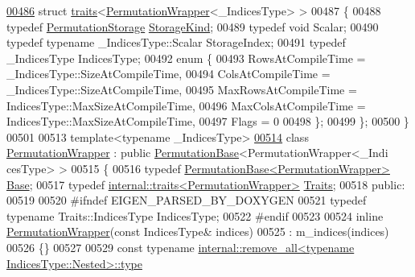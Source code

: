 \begin{DoxyCode}
\hyperlink{struct_eigen_1_1internal_1_1traits_3_01_permutation_wrapper_3_01___indices_type_01_4_01_4}{00486} \textcolor{keyword}{struct }\hyperlink{struct_eigen_1_1internal_1_1traits}{traits}<\hyperlink{group___core___module_class_eigen_1_1_permutation_wrapper}{PermutationWrapper}<\_IndicesType> >
00487 \{
00488   \textcolor{keyword}{typedef} \hyperlink{struct_eigen_1_1_permutation_storage}{PermutationStorage} \hyperlink{struct_eigen_1_1_permutation_storage}{StorageKind};
00489   \textcolor{keyword}{typedef} \textcolor{keywordtype}{void} Scalar;
00490   \textcolor{keyword}{typedef} \textcolor{keyword}{typename} \_IndicesType::Scalar StorageIndex;
00491   \textcolor{keyword}{typedef} \_IndicesType IndicesType;
00492   \textcolor{keyword}{enum} \{
00493     RowsAtCompileTime = \_IndicesType::SizeAtCompileTime,
00494     ColsAtCompileTime = \_IndicesType::SizeAtCompileTime,
00495     MaxRowsAtCompileTime = IndicesType::MaxSizeAtCompileTime,
00496     MaxColsAtCompileTime = IndicesType::MaxSizeAtCompileTime,
00497     Flags = 0
00498   \};
00499 \};
00500 \}
00501 
00513 \textcolor{keyword}{template}<\textcolor{keyword}{typename} \_IndicesType>
\hyperlink{group___core___module}{00514} \textcolor{keyword}{class }\hyperlink{group___core___module_class_eigen_1_1_permutation_wrapper}{PermutationWrapper} : \textcolor{keyword}{public} \hyperlink{group___core___module_class_eigen_1_1_permutation_base}{PermutationBase}<PermutationWrapper<\_Indi
      cesType> >
00515 \{
00516     \textcolor{keyword}{typedef} \hyperlink{group___core___module_class_eigen_1_1_permutation_base}{PermutationBase<PermutationWrapper>} 
      \hyperlink{group___core___module_class_eigen_1_1_permutation_base}{Base};
00517     \textcolor{keyword}{typedef} \hyperlink{struct_eigen_1_1internal_1_1traits}{internal::traits<PermutationWrapper>} 
      \hyperlink{struct_eigen_1_1internal_1_1traits}{Traits};
00518   \textcolor{keyword}{public}:
00519 
00520 \textcolor{preprocessor}{    #ifndef EIGEN\_PARSED\_BY\_DOXYGEN}
00521     \textcolor{keyword}{typedef} \textcolor{keyword}{typename} Traits::IndicesType IndicesType;
00522 \textcolor{preprocessor}{    #endif}
00523 
00524     \textcolor{keyword}{inline} \hyperlink{group___core___module_class_eigen_1_1_permutation_wrapper}{PermutationWrapper}(\textcolor{keyword}{const} IndicesType& indices)
00525       : m\_indices(indices)
00526     \{\}
00527 
00529     \textcolor{keyword}{const} \textcolor{keyword}{typename} \hyperlink{group___sparse_core___module}{internal::remove\_all<typename IndicesType::Nested>::type}

\end{DoxyCode}
